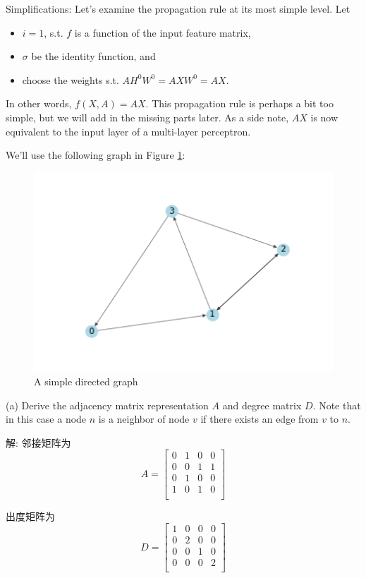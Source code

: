 \documentclass[openany]{ctexbook}
\theoremstyle{kaiti}
\theoremstyle{normal}
\begin{document}
Simplifications: Let's examine the propagation rule at its most simple level. Let
\begin{itemize}
    \item $i = 1$, s.t. $f$ is a function of the input feature matrix,
    \item $\sigma$ be the identity function, and
    \item choose the weights s.t. $AH^0W^0 = AXW^0 = AX$.
\end{itemize}

In other words, $f(X, A) = AX$. This propagation rule is perhaps a bit too simple, but we will add in the missing parts later. As a side note, $AX$ is now equivalent to the input layer of a multi-layer perceptron.

We'll use the following graph in Figure \ref{fig:2_1}:
\begin{figure}[ht]
    \centering
    \includegraphics[scale=0.6]{graph.png}
    \caption{A simple directed graph}
    \label{fig:2_1}
\end{figure}

(a) Derive the adjacency matrix representation $A$ and degree matrix $D$. Note that in this case a node $n$ is a neighbor of node $v$ if there exists an edge from $v$ to $n$.

解: 邻接矩阵为
\begin{equation}
  A=\begin{bmatrix}
    0 & 1 & 0 & 0 \\
    0 & 0 & 1 & 1 \\
    0 & 1 & 0 & 0 \\
    1 & 0 & 1 & 0 \\
  \end{bmatrix}
\end{equation}

出度矩阵为
\begin{equation}
  D=\begin{bmatrix}
    1 & 0 & 0 & 0 \\
    0 & 2 & 0 & 0 \\
    0 & 0 & 1 & 0 \\
    0 & 0 & 0 & 2 \\
  \end{bmatrix}
\end{equation}
\end{document}
